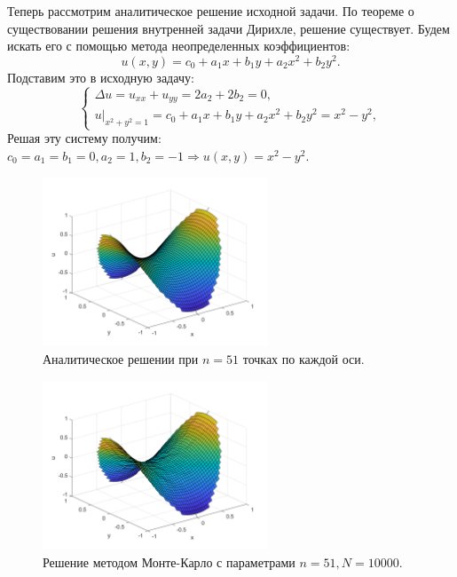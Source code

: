 \documentclass[oneside, final, 12pt]{article}
\begin{document}
	Теперь рассмотрим аналитическое решение исходной задачи.
	\newline
	По теореме о существовании решения внутренней задачи Дирихле, решение существует.\newline
	Будем искать его с помощью метода неопределенных коэффициентов:
	$$
		u(x,y) = c_0+ a_1x +b_1y+a_2x^2+b_2y^2.
	$$
	Подставим это в исходную задачу:
	$$
		\begin{cases}
			\Delta u = u_{xx} + u_{yy} = 2a_2+2b_2 = 0, \\
			 u|_{x^2+y^2 = 1} =  c_0+ a_1x +b_1y+a_2x^2+b_2y^2 = x^2 - y^2, 
		\end{cases}
	$$
	Решая эту систему получим: $c_0=a_1=b_1=0, a_2=1, b_2 = -1 \Rightarrow u(x,y)= x^2-y^2$.
    \begin{figure}[h!]
		\centering
		\includegraphics[width=0.6\textwidth]{../code/Task_8/pict/an_51_10000_ex.png}
		\caption{Аналитическое решении при $n = 51$ точках по каждой оси.}
    \end{figure}
   	\newpage
    \begin{figure}[h!]
		\centering
		\includegraphics[width=0.6\textwidth]{../code/Task_8/pict/mc_51_10000_ex.png}
		\caption{Решение методом Монте-Карло с параметрами $n = 51, N =10000$. }
    \end{figure}
    \newpage
\end{document}
